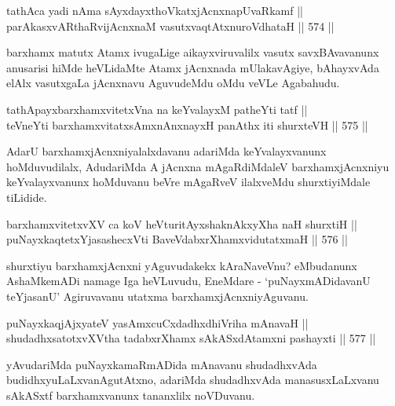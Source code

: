 \begin{shl}
tathAca yadi nAma sAyxdayxthoVkatxjAcnxnapUvaRkamf || \\
parAkasxvARthaRvijAcnxnaM vasutxvaqtAtxnuroVdhataH \hfill || 574 ||  
\end{shl}

\begin{artha}
barxhamx matutx Atamx ivugaLige aikayxviruvalilx vasutx savxBAvavanunx
anusarisi hiMde heVLidaMte Atamx jAcnxnada mUlakavAgiye, bAhayxvAda
elAlx vasutxgaLa jAcnxnavu AguvudeMdu oMdu veVLe Agabahudu.
\end{artha}

\begin{shl}
tathA\s payxbarxhamxvitetxVna na keYvalayxM patheYti tatf || \\
teVneYti barxhamxvitatxsAmxnAnxnayxH panAthx iti shurxteVH \hfill || 575 ||  
\end{shl}

\begin{artha}
AdarU barxhamxjAcnxniyalalxdavanu adariMda keYvalayxvanunx
hoMduvudilalx, AdudariMda A jAcnxna mAgaRdiMdaleV barxhamxjAcnxniyu
keYvalayxvanunx hoMduvanu beVre mAgaRveV ilalxveMdu shurxtiyiMdale\break
tiLidide.
\end{artha}


\begin{shl}
barxhamxvitetxvXV ca koV heVturitAyxshaknAkxyX\s \s ha naH shurxtiH || \\
puNayxkaqtetxYjasashecxVti BaveVdabxrXhamxvidutatxmaH \hfill || 576 ||  
\end{shl}

\begin{artha}
shurxtiyu barxhamxjAcnxni yAguvudakekx kAraNaveVnu? eMbudanunx
AshaMkemADi namage Iga heVLuvudu, EneMdare  - `puNayxmADidavanU
teYjasanU' Agiruvavanu utatxma barxhamxjAcnxniyAguvanu.
\end{artha}


\begin{shl}
puNayxkaqjAjxyateV yasAmxcuCxdadhxdhiVriha mAnavaH || \\
shudadhxsatotxvXV\s tha tadabxrXhamx sAkASxdAtamxni pashayxti \hfill || 577 ||  
\end{shl}

\begin{artha}
yAvudariMda puNayxkamaRmADida mAnavanu shudadhxvAda
budidhxyuLaLxvanAgutAtxno, adariMda shudadhxvAda manasusxLaLxvanu
sAkASxtf barxhamxvanunx tananxlilx noVDuvanu.
\end{artha}

